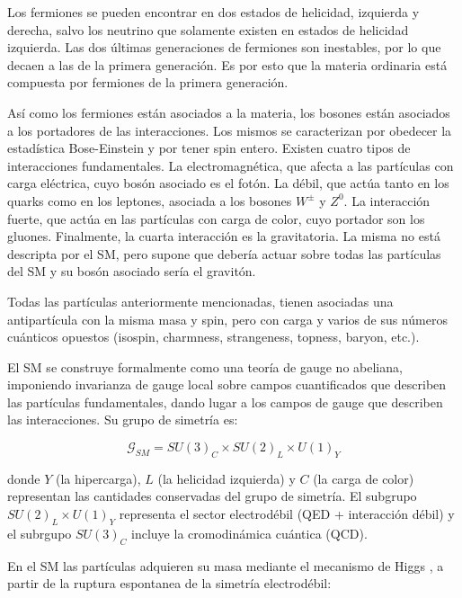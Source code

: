 Los fermiones se pueden encontrar en dos estados de helicidad, izquierda y derecha, salvo los neutrino que solamente existen en estados de helicidad izquierda. Las dos últimas generaciones de fermiones son inestables, por lo que decaen a las de la primera generación. Es por esto que la materia ordinaria está compuesta por fermiones de la primera generación.

Así como los fermiones están asociados a la materia, los bosones están asociados a los portadores de las interacciones. Los mismos se caracterizan por obedecer la estadística Bose-Einstein y por tener spin entero. Existen cuatro tipos de interacciones fundamentales. La electromagnética, que afecta a las partículas con carga eléctrica, cuyo bosón asociado es el fotón. La débil, que actúa tanto en los quarks como en los leptones, asociada a los bosones $W^{\pm}$ y $Z^{0}$. La interacción fuerte, que actúa en las partículas con carga de color, cuyo portador son los gluones. Finalmente, la cuarta interacción es la gravitatoria. La misma no está descripta por el SM, pero supone que debería actuar sobre todas las partículas del SM y su bosón asociado sería el gravitón.

Todas las partículas anteriormente mencionadas, tienen asociadas una antipartícula con la misma masa y spin, pero con carga y varios de sus números cuánticos opuestos (isospin, charmness, strangeness, topness, baryon, etc.). 

El SM se construye formalmente como una teoría de gauge no abeliana, imponiendo invarianza de gauge local sobre campos cuantificados que describen las partículas fundamentales, dando lugar a los campos de gauge que describen las interacciones. Su grupo de simetría es:

\begin{equation}
\mathcal{G}_{SM}=SU(3)_{C}\times SU(2)_{L}\times U(1)_{Y}
\end{equation}


donde $Y$ (la hipercarga), $L$ (la helicidad izquierda) y $C$ (la carga de color) representan las cantidades conservadas del grupo de simetría. El subgrupo $SU(2)_{L}\times U(1)_{Y}$ representa el sector electrodébil (QED + interacción débil) y el subrgupo $SU(3)_{C}$ incluye la cromodinámica cuántica (QCD).


En el SM las partículas adquieren su masa mediante el mecanismo de Higgs \cite{PhysRevLett.13.508}, a partir de la ruptura espontanea de la simetría electrodébil:

